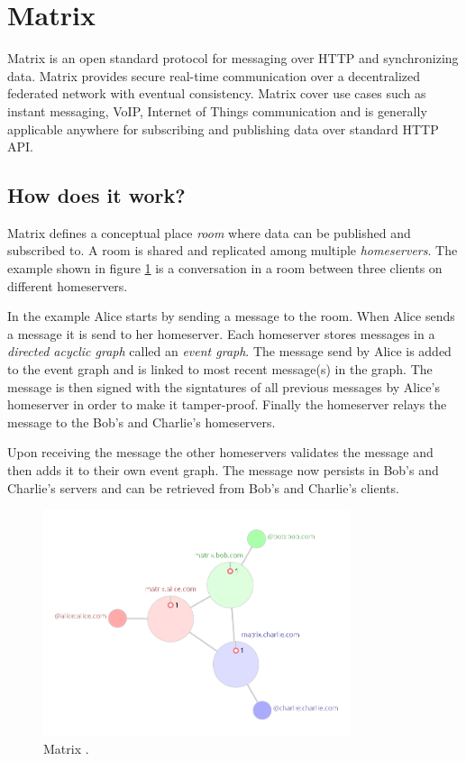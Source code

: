 \section{Matrix}

Matrix is an open standard protocol for messaging over HTTP and synchronizing data. Matrix provides secure real-time communication over a decentralized federated network with eventual consistency. Matrix cover use cases such as instant messaging, VoIP, Internet of Things communication and is generally applicable anywhere for subscribing and publishing data over standard HTTP API.




\subsection{How does it work?}

Matrix defines a conceptual place \emph{room} where data can be published and subscribed to. A room is shared and replicated among multiple \emph{homeservers}. The example shown in figure \ref{fig:matrix1} is a conversation in a room between three clients on different homeservers. 

In the example Alice starts by sending a message to the room. When Alice sends a message it is send to her homeserver. Each homeserver stores messages in a \emph{directed acyclic graph} called an \emph{event graph}. The message send by Alice is added to the event graph and is linked to most recent message(s) in the graph. The message is then signed with the signtatures of all previous messages by Alice's homeserver in order to make it tamper-proof. Finally the homeserver relays the message to the Bob's and Charlie's homeservers.

Upon receiving the message the other homeservers validates the message and then adds it to their own event graph. The message now persists in Bob's and Charlie's servers and can be retrieved from Bob's and Charlie's clients.

\begin{figure}[H]
	\centering
	\includegraphics[width=9cm]{figures/matrix1.png}
	\caption{ Matrix \cite{matrixhome}.}
	\label{fig:matrix1}
\end{figure}

